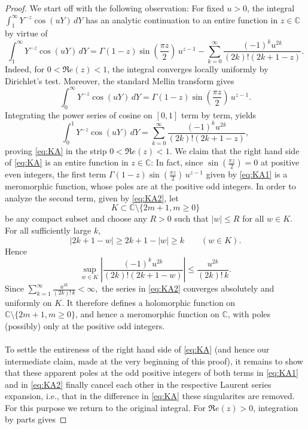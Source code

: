 \documentclass[a4paper,10pt]{amsart}
\newcommand{\C}{\mathbb C}
\theoremstyle{definition}
\numberwithin{equation}{section}
\def\C{\mathbb C}
\begin{document}
\begin{proof}
We start off with the following observation: For fixed $u>0$, the integral $\int_1^\infty Y^{-z}\cos(uY)\,dY$ has an analytic continuation to an entire function in $z\in\C$ by virtue of
\begin{equation}\label{eq:KA}
\int_1^\infty Y^{-z}\cos(uY)\,dY=\Gamma(1-z)\sin\left(\frac{\pi z}{2}\right)\,u^{z-1}-\sum_{k=0}^{\infty}\frac{(-1)^k u^{2k}}{(2k)!(2k+1-z)}.
\end{equation}
Indeed, for $0<\Re e(z)<1$, the integral  converges locally uniformly by Dirichlet's test. Moreover, the standard Mellin transform gives
\begin{equation}\label{eq:KA1}
\int_0^\infty Y^{-z}\cos(uY)\,dY = \Gamma(1-z)\sin\left(\frac{\pi z}{2}\right)\,u^{z-1}.
\end{equation}
Integrating the power series of cosine on $[0,1]$ term by term, yields
\begin{equation}\label{eq:KA2}
\int_0^1Y^{-z}\cos(uY)\,dY= \sum_{k=0}^{\infty}\frac{(-1)^k u^{2k}}{(2k)!(2k+1-z)},
\end{equation}
proving \eqref{eq:KA} in the strip $0<\Re e(z)<1$. We claim that the right hand side of \eqref{eq:KA} is an entire function in $z\in\C$: In fact, since $\sin\left(\frac{\pi z}{2}\right)=0$ at positive even integers, the first term $\Gamma(1-z)\sin\left(\frac{\pi z}{2}\right)\,u^{z-1}$ given by \eqref{eq:KA1} is a meromorphic function, whose poles are at the positive odd integers. In order to analyze the second term, given by \eqref{eq:KA2}, let
$$
K\subset\mathbb C\setminus\{2m+1, m\geq 0\}
$$
be any compact subset and choose any $R>0$ such that $|w|\le R$ for all $w\in K$. For all sufficiently large $k$,
$$
|2k+1-w| \ge 2k+1-|w| \ge k \qquad (w\in K).
$$
Hence
$$
\sup_{w\in K} \left| \frac{(-1)^k u^{2k}}{(2k)!(2k+1-w)}\right|\le\frac{u^{2k}}{(2k)!\,k}.
$$
Since $\sum_{k=1}^{\infty} \frac{u^{2k}}{(2k)!\,k}<\infty,$ the series in \eqref{eq:KA2} converges absolutely and uniformly on $K$.  It therefore defines a holomorphic function on $\mathbb C\setminus\{2m+1, m\geq 0\}$, and hence a meromorphic function on $\mathbb C$, with poles (possibly) only at the positive odd integers.\\\\ 
To settle the entireness of the right hand side of \eqref{eq:KA} (and hence our intermediate claim, made at the very beginning of this proof), it remains to show that these apparent poles at the odd positive integers of both terms in \eqref{eq:KA1} and in \eqref{eq:KA2} finally cancel each other in the respective Laurent series expansion, i.e., that in the difference in \eqref{eq:KA} these singularites are removed. For this purpose we return to the original integral.  For $\Re e(z)>0$, integration by parts gives

\end{proof}
\end{document}
